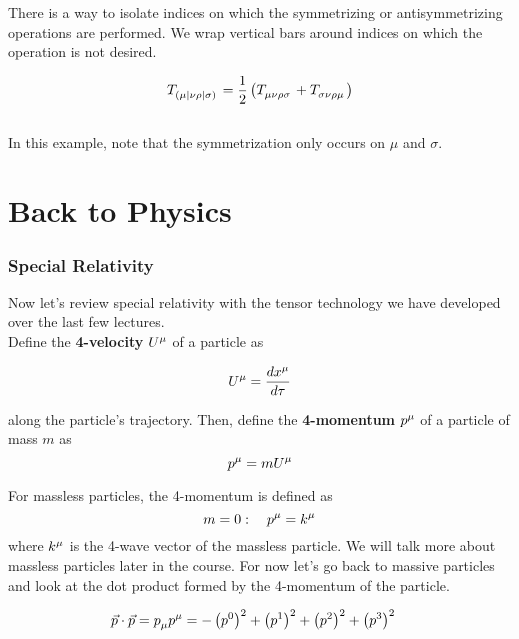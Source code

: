 \documentclass[11pt]{article}
\begin{document}
\noindent There is a way to isolate indices on which the symmetrizing or antisymmetrizing operations are performed. We wrap vertical bars around indices on which the operation is not desired.

\begin{equation}
  \tensor{T}{_{(\mu|\nu\rho|\sigma)}}=\frac{1}{2}\left(\tensor{T}{_\mu_\nu_\rho_\sigma}+\tensor{T}{_\sigma_\nu_\rho_\mu}\right)
\end{equation}\\
\noindent In this example, note that the symmetrization only occurs on $\mu$ and $\sigma$.


\part{Back to Physics}
\section{Special Relativity}

Now let's review special relativity with the tensor technology we have developed over the last few lectures.\\

\noindent Define the \textbf{4-velocity} $\tensor{U}{^\mu}$ of a particle as

\begin{equation}
  \tensor{U}{^\mu}=\dfrac{d\tensor{x}{^\mu}}{d\tau}
\end{equation}

\noindent along the particle's trajectory. Then, define the \textbf{4-momentum} $\tensor{p}{^\mu}$ of a particle of mass $m$ as
\begin{equation}
  \tensor{p}{^\mu}=m\tensor{U}{^\mu}
\end{equation}

\noindent For massless particles, the 4-momentum is defined as
\begin{equation}
  m=0: \quad\tensor{p}{^\mu}=\tensor{k}{^\mu}
\end{equation}
where $\tensor{k}{^\mu}$ is the 4-wave vector of the massless particle. We will talk more about massless particles later in the course. For now let's go back to massive particles and look at the dot product formed by the 4-momentum of the particle.

\begin{align}
  \vec{p}\cdot\vec{p}&=\tensor{p}{_\mu}\tensor{p}{^\mu}=-\left(p^0\right)^2+\left(p^1\right)^2+\left(p^2\right)^2+\left(p^3\right)^2 \label{Pdot1}
\end{align}
\end{document}
